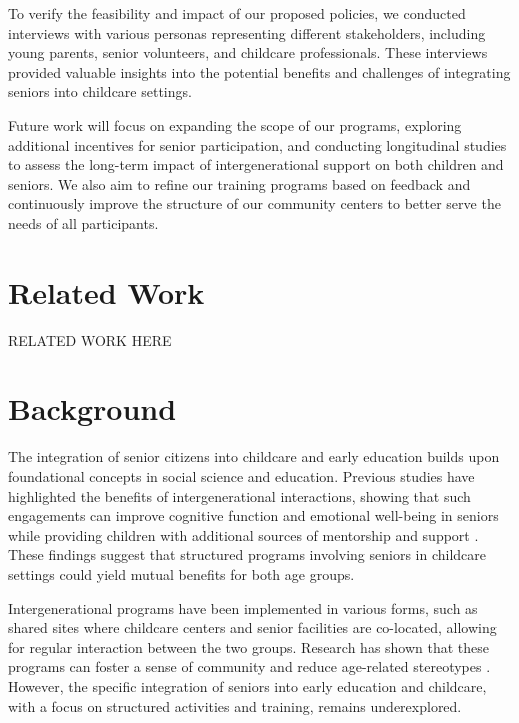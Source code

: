 \documentclass{article} %
\begin{document}
To verify the feasibility and impact of our proposed policies, we conducted interviews with various personas representing different stakeholders, including young parents, senior volunteers, and childcare professionals. These interviews provided valuable insights into the potential benefits and challenges of integrating seniors into childcare settings.

Future work will focus on expanding the scope of our programs, exploring additional incentives for senior participation, and conducting longitudinal studies to assess the long-term impact of intergenerational support on both children and seniors. We also aim to refine our training programs based on feedback and continuously improve the structure of our community centers to better serve the needs of all participants.

\section{Related Work}
\label{sec:related}
RELATED WORK HERE

\section{Background}
\label{sec:background}

The integration of senior citizens into childcare and early education builds upon foundational concepts in social science and education. Previous studies have highlighted the benefits of intergenerational interactions, showing that such engagements can improve cognitive function and emotional well-being in seniors while providing children with additional sources of mentorship and support \citep{park2023generative, shanahan2023role}. These findings suggest that structured programs involving seniors in childcare settings could yield mutual benefits for both age groups.

Intergenerational programs have been implemented in various forms, such as shared sites where childcare centers and senior facilities are co-located, allowing for regular interaction between the two groups. Research has shown that these programs can foster a sense of community and reduce age-related stereotypes \citep{liu2023agentbench}. However, the specific integration of seniors into early education and childcare, with a focus on structured activities and training, remains underexplored.
\end{document}
